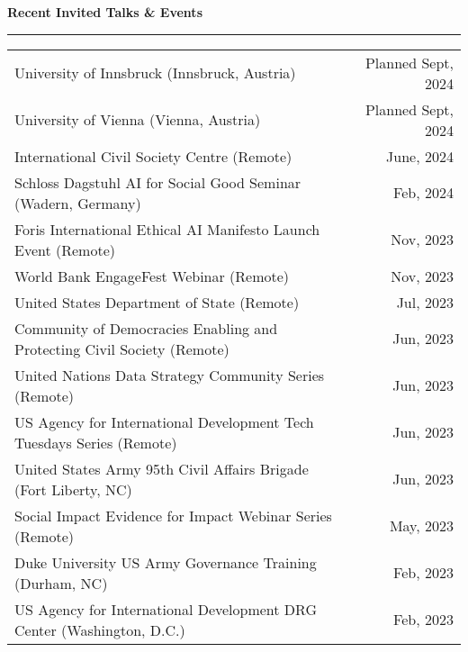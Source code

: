 \documentclass[11pt]{article}
\begin{document}
\bigskip
\textbf{\large Recent Invited Talks \& Events}\\
\rule[3mm]{\textwidth}{.2pt}
\noindent\begin{tabular*}{\textwidth}{@{}l@{\extracolsep{\fill}}r@{}}

University of Innsbruck (Innsbruck, Austria) & Planned Sept, 2024\\

University of Vienna (Vienna, Austria) & Planned Sept, 2024\\

International Civil Society Centre (Remote) & June, 2024\\

Schloss Dagstuhl AI for Social Good Seminar (Wadern, Germany) & Feb, 2024\\

Foris International Ethical AI Manifesto Launch Event (Remote) & Nov, 2023\\

World Bank EngageFest Webinar (Remote) & Nov, 2023\\

United States Department of State (Remote) & Jul, 2023\\

Community of Democracies Enabling and Protecting Civil Society (Remote) & Jun, 2023\\

United Nations Data Strategy Community Series (Remote) & Jun, 2023\\

US Agency for International Development Tech Tuesdays Series (Remote) & Jun, 2023\\

United States Army 95th Civil Affairs Brigade (Fort Liberty, NC) & Jun, 2023\\

Social Impact Evidence for Impact Webinar Series (Remote) & May, 2023\\


Duke University US Army Governance Training (Durham, NC) & Feb, 2023\\

US Agency for International Development DRG Center (Washington, D.C.) & Feb, 2023\\
 

\end{tabular*}
\end{document}
